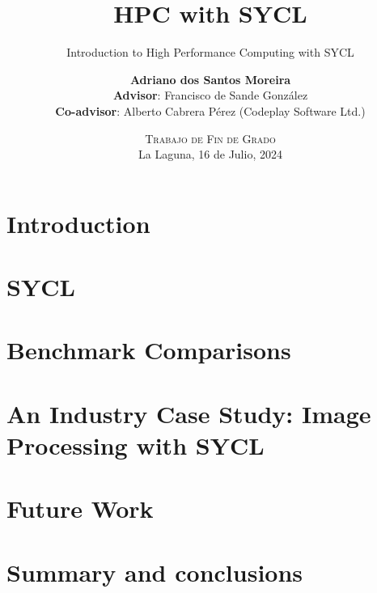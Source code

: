 \documentclass[blue,uncompressed]{beamer}
\title{\textbf{HPC with SYCL}}
\subtitle{Introduction to High Performance Computing with SYCL}
\author[Adriano dos Santos Moreira]
{
	\textbf{Adriano dos Santos Moreira} \\ \textbf{Advisor}: Francisco de Sande González \\ \textbf{Co-advisor}: Alberto Cabrera Pérez (Codeplay Software Ltd.)
}
\institute[ULL]
\date[Trabajo de Fin de Grado]{\textsc{Trabajo de Fin de Grado}     \\
                           La Laguna, 16 de Julio, 2024}
\begin{document}
	\begin{frame}[plain]
	\titlepage
	\end{frame}

  \section{Introduction}
  
  \section{SYCL}
  
  \section{Benchmark Comparisons}
  
  \section{An Industry Case Study: Image Processing with SYCL}
  
  \section{Future Work}
  
  \section{Summary and conclusions}
  
  
\end{document}
